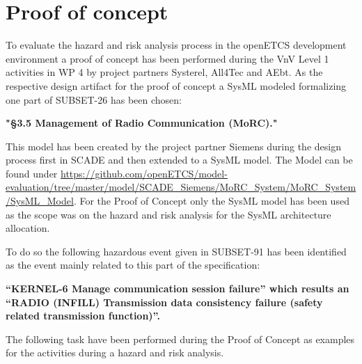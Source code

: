 \documentclass{template/openetcs_report}
\begin{document}
\section{Proof of concept}
\label{sec:Proofofconcept}

To evaluate the hazard and risk analysis process in the openETCS development environment a proof of concept has been performed during the VnV Level 1 activities in WP 4 by project partners Systerel, All4Tec and AEbt. As the respective design artifact for the proof of concept a SysML modeled formalizing one part of SUBSET-26 has been chosen: 

\begin{center}
\textbf{"\S 3.5 Management of Radio Communication (MoRC)."}
\end{center}

This model has been created by the project partner Siemens during the design process first in SCADE and then extended to a SysML model. The Model can be found under \url{https://github.com/openETCS/model-evaluation/tree/master/model/SCADE_Siemens/MoRC_System/MoRC_System/SysML_Model}. For the Proof of Concept only the SysML model has been used as the scope was on the hazard and risk analysis for the SysML architecture allocation.

To do so the following hazardous event given in SUBSET-91 has been identified as the event mainly related to this part of the specification:
\begin{center}
\textbf{“KERNEL-6 Manage communication session failure” which results an “RADIO (INFILL) Transmission data consistency failure (safety related transmission function)”.}
\end{center}

The following task have been performed during the Proof of Concept as examples for the activities during a hazard and risk analysis. 
 
\end{document}
